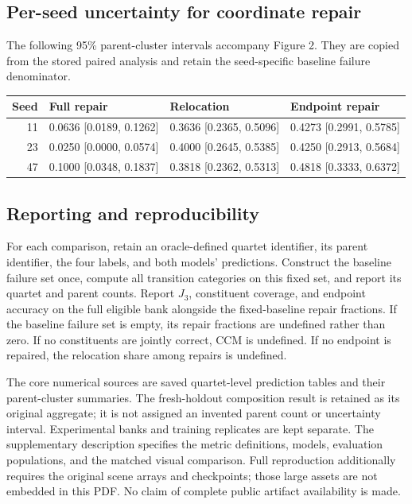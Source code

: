 \hypertarget{per-seed-uncertainty-for-coordinate-repair}{%
\subsection{Per-seed uncertainty for coordinate repair}\label{per-seed-uncertainty-for-coordinate-repair}}

The following 95\% parent-cluster intervals accompany Figure 2. They are copied from the stored paired analysis and retain the seed-specific baseline failure denominator.

\begin{longtable}[]{@{}rlll@{}}
\toprule
Seed & Full repair & Relocation & Endpoint repair\tabularnewline
\midrule
\endhead
11 & 0.0636 {[}0.0189, 0.1262{]} & 0.3636 {[}0.2365, 0.5096{]} & 0.4273 {[}0.2991, 0.5785{]}\tabularnewline
23 & 0.0250 {[}0.0000, 0.0574{]} & 0.4000 {[}0.2645, 0.5385{]} & 0.4250 {[}0.2913, 0.5684{]}\tabularnewline
47 & 0.1000 {[}0.0348, 0.1837{]} & 0.3818 {[}0.2362, 0.5313{]} & 0.4818 {[}0.3333, 0.6372{]}\tabularnewline
\bottomrule
\end{longtable}

\hypertarget{reporting-and-reproducibility}{%
\subsection{Reporting and reproducibility}\label{reporting-and-reproducibility}}

For each comparison, retain an oracle-defined quartet identifier, its parent identifier, the four labels, and both models' predictions. Construct the baseline failure set once, compute all transition categories on this fixed set, and report its quartet and parent counts. Report \(J_3\), constituent coverage, and endpoint accuracy on the full eligible bank alongside the fixed-baseline repair fractions. If the baseline failure set is empty, its repair fractions are undefined rather than zero. If no constituents are jointly correct, CCM is undefined. If no endpoint is repaired, the relocation share among repairs is undefined.

The core numerical sources are saved quartet-level prediction tables and their parent-cluster summaries. The fresh-holdout composition result is retained as its original aggregate; it is not assigned an invented parent count or uncertainty interval. Experimental banks and training replicates are kept separate. The supplementary description specifies the metric definitions, models, evaluation populations, and the matched visual comparison. Full reproduction additionally requires the original scene arrays and checkpoints; those large assets are not embedded in this PDF. No claim of complete public artifact availability is made.
